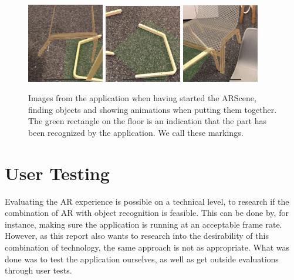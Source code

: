 \begin{figure}[!hbtp]
\begin{center}
\includegraphics[width = 0.3\textwidth]{./Images/Application4}
\includegraphics[width = 0.3\textwidth]{./Images/Application5}
\includegraphics[width = 0.3\textwidth]{./Images/Application6}
\caption{Images from the application when having started the ARScene, finding objects and showing animations when putting them together. The green rectangle on the floor is an indication that the part has been recognized by the application. We call these markings.}
\label{fig:applicationAssembler}
\end{center}
\end{figure}

\section{User Testing}
\label{sec:usertest}
Evaluating the AR experience is possible on a technical level, to research if the 
combination of AR with object recognition is feasible. This can be done by, for instance,  
making sure the application is running at an acceptable frame rate. However, as this 
report also wants to research into the desirability of this combination of technology, the 
same approach is not as appropriate. What was done was to test the 
application ourselves, as well as get outside evaluations through user tests.

